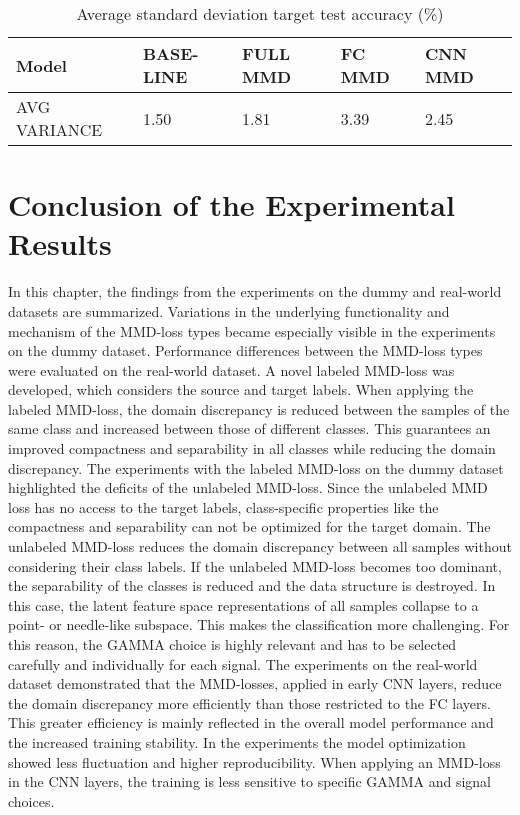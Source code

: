 \begin {table}[H]
\centering
\begin{tabular}{lllll}
  \toprule
  Model & BASE-LINE & FULL MMD & FC MMD & CNN MMD\\
  \midrule
  AVG VARIANCE & 1.50 & 1.81 & 3.39 & 2.45\\
  \bottomrule
\end{tabular}
\caption {Average standard deviation target test accuracy (\%)} \label{tab:Average_Variance_Accuracy} 
\end {table}

\section{Conclusion of the Experimental Results}\label{sec:Performance_overview}
In this chapter, the findings from the experiments on the dummy and real-world datasets are summarized. Variations in the underlying functionality and mechanism of the MMD-loss types became especially visible in the experiments on the dummy dataset. Performance differences between the MMD-loss types were evaluated on the real-world dataset. A novel labeled MMD-loss was developed, which considers the source and target labels. When applying the labeled MMD-loss, the domain discrepancy is reduced between the samples of the same class and increased between those of different classes. This guarantees an improved compactness and separability in all classes while reducing the domain discrepancy. The experiments with the labeled MMD-loss on the dummy dataset highlighted the deficits of the unlabeled MMD-loss. Since the unlabeled MMD loss has no access to the target labels, class-specific properties like the compactness and separability can not be optimized for the target domain. The unlabeled MMD-loss reduces the domain discrepancy between all samples without considering their class labels. If the unlabeled MMD-loss becomes too dominant, the separability of the classes is reduced and the data structure is destroyed. In this case, the latent feature space representations of all samples collapse to a point- or needle-like subspace. This makes the classification more challenging. For this reason, the GAMMA choice is highly relevant and has to be selected carefully and individually for each signal. The experiments on the real-world dataset demonstrated that the MMD-losses, applied in early CNN layers, reduce the domain discrepancy more efficiently than those restricted to the FC layers. This greater efficiency is mainly reflected in the overall model performance and the increased training stability. In the experiments the model optimization showed less fluctuation and higher reproducibility. When applying an MMD-loss in the CNN layers, the training is less sensitive to specific GAMMA and signal choices. 